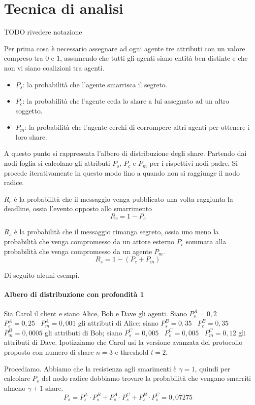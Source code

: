 \section{Tecnica di analisi}
TODO rivedere notazione

Per prima cosa è necessario assegnare ad ogni agente tre attributi con un valore
compreso tra 0 e 1, assumendo che tutti gli agenti siano entità ben distinte e
che non vi siano coalizioni tra agenti.

\begin{itemize}
	\item $ P_s $: la probabilità
	      che l'agente smarrisca il segreto.
	\item $ P_c $: la probabilità che l'agente ceda
	      lo share a lui assegnato ad un altro soggetto.
	\item $ P_m $: la probabilità che l'agente cerchi di
	      corrompere altri agenti per ottenere i loro share.
\end{itemize}

A questo punto si rappresenta l'albero di distribuzione degli share.
Partendo dai nodi foglia si calcolano gli attributi $ P_s $, $ P_c $ e $ P_m $
per i rispettivi nodi padre. Si procede iterativamente in questo modo
fino a quando non si raggiunge il nodo radice.

$ R_c $ è la probabilità che il messaggio venga
pubblicato una volta raggiunta la deadline, ossia l'evento opposto allo smarrimento
$$ R_c = 1 - P_c $$

$ R_s $ è la probabilità che il messaggio rimanga segreto, ossia uno meno la probabilità che venga compromesso
da un attore esterno $ P_c $ sommata alla probabilità che venga compromesso da un agente $ P_m $.
$$ R_s = 1 - (P_c + P_m) $$


Di seguito alcuni esempi.

\paragraph{Albero di distribuzione con profondità 1}
Sia Carol il client e siano Alice, Bob e Dave gli agenti.
Siano
$ P_s^A = 0,2 $ \,
$ P_c^A = 0,25 $ \,
$ P_m^A = 0,001 $
gli attributi di Alice;
siano
$ P_s^B = 0,35 $ \,
$ P_c^B = 0,35 $ \,
$ P_m^B = 0,0005 $
gli attributi di Bob;
siano
$ P_s^C = 0,005 $ \,
$ P_c^C = 0,005 $ \,
$ P_m^C = 0,12 $
gli attributi di Dave.
Ipotizziamo che Carol usi la versione avanzata del protocollo
proposto con numero di share $ n = 3 $ e threshold $ t = 2 $.

Procediamo. Abbiamo che la resistenza agli smarimenti è $ \gamma = 1 $, quindi per calcolare $ P_s $ del nodo
radice dobbiamo trovare la probabilità che vengano smarriti almeno $ \gamma + 1 $ share.
$$ P_s = P_s^A \cdot P_s^B + P_s^A \cdot P_s^C + P_s^B \cdot P_s^C = 0,07275 $$

